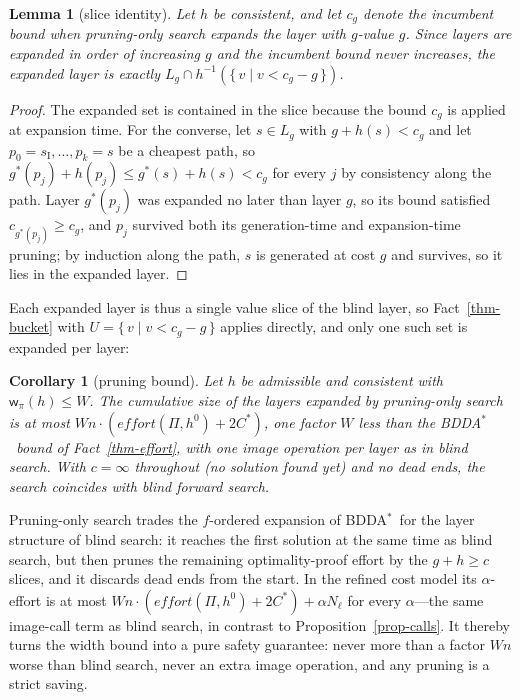 \documentclass[letterpaper]{article}
\newcommand{\task}{\ensuremath{\Pi}}
\newcommand{\sinit}{\ensuremath{s_{\mathrm{I}}}}
\newcommand{\hblind}{\ensuremath{h^{0}}}
\newcommand{\gstar}{\ensuremath{g^{*}}}
\newcommand{\copt}{\ensuremath{C^{*}}}
\newcommand{\width}{\ensuremath{\mathsf{w}}}
\newcommand{\effort}{\ensuremath{\mathit{effort}}}
\newcommand{\bddastar}{BDDA\ensuremath{^{*}}}
\theoremstyle{plain}
\newtheorem{lemma}{Lemma}
\newtheorem{corollary}{Corollary}
\theoremstyle{definition}
\theoremstyle{remark}
\begin{document}
\begin{lemma}[slice identity]
\label{lem-slice}
Let $h$ be consistent, and let $c_g$ denote the incumbent bound when
pruning-only search expands the layer with $g$-value $g$. Since layers
are expanded in order of increasing $g$ and the incumbent bound never
increases, the expanded layer is exactly
$L_g \cap h^{-1}(\{\, v \mid v < c_g - g \,\})$.
\end{lemma}

\begin{proof}
The expanded set is contained in the slice because the bound $c_g$ is
applied at expansion time. For the converse, let
$s \in L_g$ with $g + h(s) < c_g$ and let
$p_0 = \sinit, \dots, p_k = s$ be a cheapest path, so
$\gstar(p_j) + h(p_j) \leq \gstar(s) + h(s) < c_g$ for every $j$ by
consistency along the path. Layer $\gstar(p_j)$ was expanded no later
than layer $g$, so its bound satisfied $c_{\gstar(p_j)} \geq c_g$, and
$p_j$ survived both its generation-time and expansion-time pruning; by
induction along the path, $s$ is generated at cost $g$ and survives, so
it lies in the expanded layer.
\end{proof}

Each expanded layer is thus a single value slice of the blind layer, so
Fact~\ref{thm-bucket} with $U = \{\, v \mid v < c_g - g \,\}$ applies
directly, and only one such set is expanded per layer:

\begin{corollary}[pruning bound]
\label{cor-prune}
Let $h$ be admissible and consistent with $\width_\pi(h) \leq W$. The
cumulative size of the layers expanded by pruning-only search is at most
$W n \cdot (\effort(\task, \hblind) + 2\copt)$, one factor $W$ less than
the \bddastar\ bound of Fact~\ref{thm-effort}, with one image
operation per layer as in blind search. With $c = \infty$ throughout
(no solution found yet) and no dead ends, the search coincides with
blind forward search.
\end{corollary}

Pruning-only search trades the $f$-ordered expansion of \bddastar\ for
the layer structure of blind search: it reaches the first solution at
the same time as blind search, but then prunes the remaining
optimality-proof effort by the $g + h \geq c$ slices, and it discards
dead ends from the start. In the refined cost model its
$\alpha$-effort is at most
$W n \cdot (\effort(\task, \hblind) + 2\copt) + \alpha N_\ell$ for every
$\alpha$---the same image-call term as blind search, in contrast to
Proposition~\ref{prop-calls}. It thereby turns the width bound into a
pure safety guarantee: never more than a factor $Wn$ worse than blind
search, never an extra image operation, and any pruning is a strict
saving.
\end{document}
